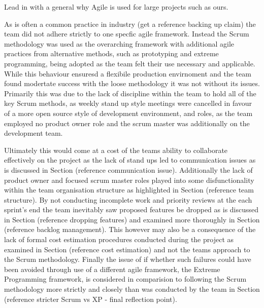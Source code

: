 \documentclass{l3proj}
\begin{document}

Lead in with a general why Agile is used for large projects such as ours.

As is often a common practice in industry (get a reference backing up claim) the team did not adhere strictly to one specfic agile framework. Instead the Scrum methodology was used as the overarching framework with additional agile practices from alternative methods, such as prototyping and extreme programming, being adopted as the team felt their use necessary and applicable. While this behaviour ensuresd a flexibile production envirnoment and the team found modertate success with the loose methodology it was not without its issues. Primarily this was due to the lack of discipline within the team to hold all of the key Scrum methods, as weekly stand up style meetings were cancelled in favour of a more open source style of development environment, and roles, as the team employed no product owner role and the scrum master was additionally on the development team. 

Ultimately this would come at a cost of the teams ability to collaborate effectively on the project as the lack of stand ups led to communication issues as is discussed in Section (reference communication issue). Additionally the lack of product owner and focused scrum master roles played into some disfunctionality within the team organisation structure as highlighted in Section (reference team structure). By not conducting incomplete work and priority reviews at the each sprint's end the team inevitably saw proposed features be dropped as is discussed in Section (reference dropping features) and examined more thoroughly in Section (reference backlog management). This however may also be a consequence of the lack of formal cost estimation procedures conducted during the project as examined in Section (reference cost estimation) and not the teams approach to the Scrum methodology. Finally the issue of if whether such failures could have been avoided through use of a different agile framework, the Extreme Programming framework, is considered in comparision to following the Scrum methodology more strictly and closely than was conducted by the team in Section (reference stricter Scrum vs XP - final reflection point).
\end{document}
